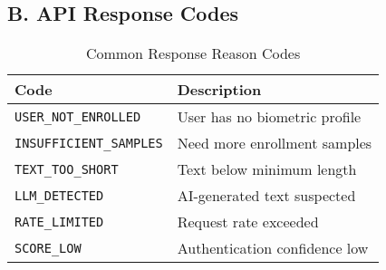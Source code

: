\documentclass[12pt,a4paper]{article}
\begin{document}
\subsection*{B. API Response Codes}

\begin{table}[h]
\centering
\begin{tabular}{@{}ll@{}}
\toprule
Code & Description \\ \midrule
\texttt{USER\_NOT\_ENROLLED} & User has no biometric profile \\
\texttt{INSUFFICIENT\_SAMPLES} & Need more enrollment samples \\
\texttt{TEXT\_TOO\_SHORT} & Text below minimum length \\
\texttt{LLM\_DETECTED} & AI-generated text suspected \\
\texttt{RATE\_LIMITED} & Request rate exceeded \\
\texttt{SCORE\_LOW} & Authentication confidence low \\
\bottomrule
\end{tabular}
\caption{Common Response Reason Codes}
\end{table}
\end{document}
